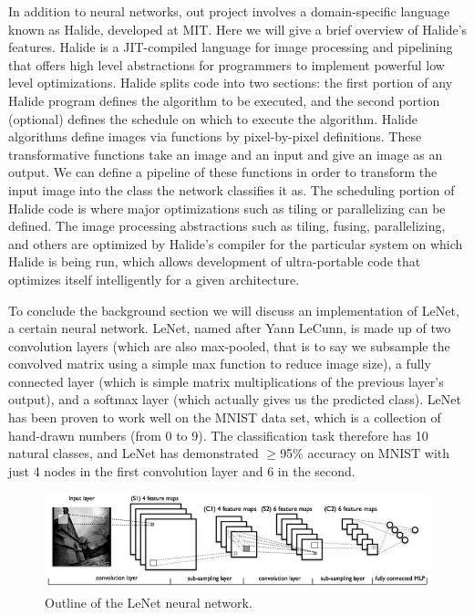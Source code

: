 \documentclass[11pt,twoside]{article}
\begin{document}
In addition to neural networks, out project involves a domain-specific language known as Halide, developed at MIT.
Here we will give a brief overview of Halide's features.
Halide is a JIT-compiled language for image processing and pipelining that offers high level abstractions for programmers to implement powerful low level optimizations.
Halide splits code into two sections: the first portion of any Halide program defines the algorithm to be executed, and the second portion (optional) defines the schedule on which to execute the algorithm.
Halide algorithms define images via functions by pixel-by-pixel definitions.
These transformative functions take an image and an input and give an image as an output.
We can define a pipeline of these functions in order to transform the input image into the class the network classifies it as.
The scheduling portion of Halide code is where major optimizations such as tiling or parallelizing can be defined.
The image processing abstractions such as tiling, fusing, parallelizing, and others are optimized by Halide's compiler for the particular system on which Halide is being run, which allows development of ultra-portable code that optimizes itself intelligently for a given architecture.

To conclude the background section we will discuss an implementation of LeNet, a certain neural network.
LeNet, named after Yann LeCunn, is made up of two convolution layers (which are also max-pooled, that is to say we subsample the convolved matrix using a simple max function to reduce image size), a fully connected layer (which is simple matrix multiplications of the previous layer's output), and a softmax layer (which actually gives us the predicted class).
LeNet has been proven to work well on the MNIST data set, which is a collection of hand-drawn numbers (from 0 to 9).
The classification task therefore has 10 natural classes, and LeNet has demonstrated $\geq$95\% accuracy on MNIST with just 4 nodes in the first convolution layer and 6 in the second.

\begin{figure}
\centering
\includegraphics[scale=.8]{network.png}
\caption{Outline of the LeNet neural network.}
\end{figure}
\end{document}
